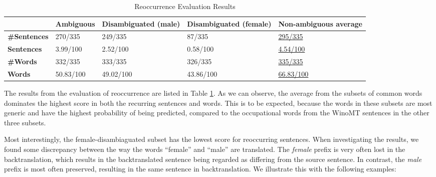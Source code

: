 \begin{table}[!htb]
    \begin{subtable}{\textwidth}
        \centering
        \begin{tabularx}{\linewidth}{|X|XXXX|}
            \hline
             & \textbf{Ambiguous} & \textbf{Disambiguated (male)} & \textbf{Disambiguated (female)} & \textbf{Non-ambiguous average} \\ \hline
             \textbf{\#Sentences} & 270/335 & 249/335 & 87/335 & \underline{295/335} \\ 
             \textbf{Sentences} & 3.99/100 & 2.52/100 & 0.58/100 & \underline{4.54/100} \\ \hline
             \textbf{\#Words} & 332/335 & 333/335 & 326/335 & \underline{335/335} \\
             \textbf{Words} & 50.83/100 & 49.02/100 & 43.86/100 & \underline{66.83/100} \\ \hline
        \end{tabularx}
        \label{tab:reoccurrence_sampling}
    \end{subtable}
    
    \caption{Reoccurrence Evaluation Results}
    \label{tab:reoccurrence}
\end{table}

The results from the evaluation of reoccurrence are listed in Table \ref{tab:reoccurrence}.
As we can observe, the average from the subsets of common words dominates the highest score in both the recurring sentences and words. This is to be expected, because the words in these subsets are most generic and have the highest probability of being predicted, compared to the occupational words from the WinoMT sentences in the other three subsets. 

Most interestingly, the female-disambiaguated subset has the lowest score for reoccurring sentences. When investigating the results, we found some discrepancy between the way the words “female” and “male” are translated. The \textit{female} prefix is very often lost in the backtranslation, which results in the backtranslated sentence being regarded as differing from the source sentence. In contrast, the \textit{male} prefix is most often preserved, resulting in the same sentence in backtranslation. We illustrate this with the following examples:

